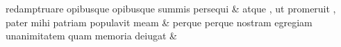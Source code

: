 \documentclass[12pt,onecolumn,twoside,a4paper]{memoir}
\begin{document}
\begin{pairs}
\begin{Leftside}
                              redamptruare
                              opibusque
                              {opibusque}
                              summis
                              persequi \&
                         \stanza {}
                     atque
                              ,
                              ut
                              promeruit
                              ,
                              pater
                              mihi
                              patriam
                              populavit
                              meam \&
                         \stanza {}
                     perque
                              {perque}
                              nostram
                              egregiam
                              unanimitatem
                              quam
                              memoria
                              deiugat \&
                         \stanza {}
                     

\end{Leftside}
\end{pairs}
\end{document}

